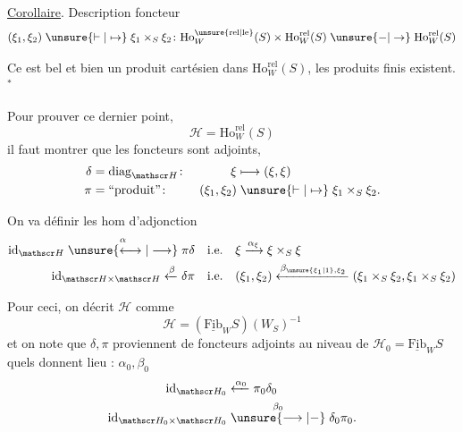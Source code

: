 
\uline{Corollaire}. Description  foncteur
\[
(\xi_1,\xi_2)\mathrel{\unsure{\vdash|\mapsto}}\xi_1\times_S\xi_2
\colon \mathrm{Ho}^{\unsure{\mathrm{rel}|\mathrm{le}}}_W(S)\times\mathrm{Ho}^{\mathrm{rel}}_W(S)
\mathrel{\unsure{-|\to}}\mathrm{Ho}^{\mathrm{rel}}_W(S)
\]

Ce  est bel et bien un produit cartésien dans $\mathrm{Ho}^{\mathrm{rel}}_W(S)$,  les produits finis existent.$^{*}$


Pour prouver ce dernier point, 
\[
\mathscr H=\mathrm{Ho}^{\mathrm{rel}}_W(S)
\]
il faut montrer que les foncteurs
sont adjoints, 
\[
\begin{aligned}
\delta &= \operatorname{diag}_{\mathscr H}\colon &\xi&\longmapsto(\xi,\xi)\\
\pi &= \text{``produit''}\colon &(\xi_1,\xi_2)&\mathrel{\unsure{\vdash|\mapsto}}\xi_1\times_S\xi_2.
\end{aligned}
\]

On va définir les hom d'adjonction
\[
\begin{aligned}
\mathrm{id}_{\mathscr H}\mathrel{\overset{\alpha}{\unsure{\longleftrightarrow|\longrightarrow}}}\pi\delta
&\quad\text{i.e.}\quad \xi\xrightarrow{\alpha_\xi}\xi\times_S\xi\\
\mathrm{id}_{\mathscr H\times\mathscr H}\xleftarrow{\beta}\delta\pi
&\quad\text{i.e.}\quad(\xi_1,\xi_2)\xleftarrow{\beta_{\unsure{\xi_1|1},\xi_2}}(\xi_1\times_S\xi_2,\xi_1\times_S\xi_2)
\end{aligned}
\]

Pour ceci, on décrit $\mathscr H$ comme
\[
\mathscr H=(\underline{\mathrm{Fib}}_W S)(W_S)^{-1}
\]
et on note que $\delta,\pi$ proviennent de foncteurs adjoints au niveau de $\mathscr H_0=\underline{\mathrm{Fib}}_W S$
quels donnent lieu : $\alpha_0,\beta_0$
\[
\begin{aligned}
\mathrm{id}_{\mathscr H_0}&\xleftarrow{\alpha_0}\pi_0\delta_0\\
\mathrm{id}_{\mathscr H_0\times\mathscr H_0}&\mathrel{\overset{\beta_0}{\unsure{\longrightarrow|-}}}\delta_0\pi_0 .
\end{aligned}
\]

